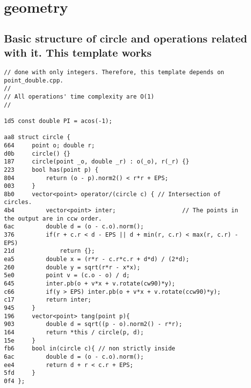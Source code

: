 \documentclass[11pt, a4paper, twoside]{article}
\begin{document}
%
%

\section{geometry}

\subsection{ Basic structure of circle and operations related with it. This template works}
\begin{lstlisting}
// done with only integers. Therefore, this template depends on point_double.cpp.
// 
// All operations' time complexity are O(1)
//

1d5 const double PI = acos(-1);

aa8 struct circle {
664     point o; double r;
d0b     circle() {}
187     circle(point _o, double _r) : o(_o), r(_r) {}
223     bool has(point p) { 
804         return (o - p).norm2() < r*r + EPS;
003     }
8b0     vector<point> operator/(circle c) { // Intersection of circles.
4b4         vector<point> inter;                   // The points in the output are in ccw order.
6ac         double d = (o - c.o).norm();
376         if(r + c.r < d - EPS || d + min(r, c.r) < max(r, c.r) - EPS)
21d             return {};
ea5         double x = (r*r - c.r*c.r + d*d) / (2*d);
260         double y = sqrt(r*r - x*x);
5e0         point v = (c.o - o) / d;
645         inter.pb(o + v*x + v.rotate(cw90)*y);
c66         if(y > EPS) inter.pb(o + v*x + v.rotate(ccw90)*y);
c17         return inter;
945     }
196     vector<point> tang(point p){
903         double d = sqrt((p - o).norm2() - r*r);
164         return *this / circle(p, d);
15e     }
fb6     bool in(circle c){ // non strictly inside
6ac         double d = (o - c.o).norm();
ee4         return d + r < c.r + EPS;
5fd     }
0f4 };
\end{lstlisting}
\end{document}
